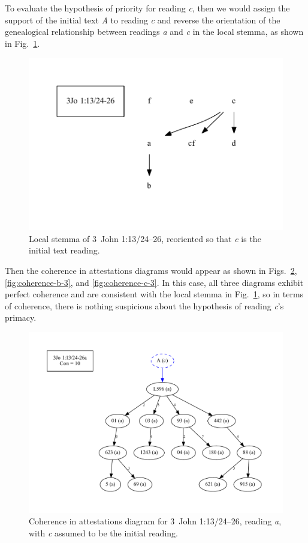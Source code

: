 \documentclass[a4paper, 12pt]{article}
\begin{document}
	To evaluate the hypothesis of priority for reading \emph{c}, then we would assign the support of the initial text \emph{A} to reading \emph{c} and reverse the orientation of the genealogical relationship between readings \emph{a} and \emph{c} in the local stemma, as shown in Fig.~\ref{fig:local-stemma-c-initial}.
	
	\begin{figure}[h!]
		\centering
		\includegraphics[scale=0.6666]{../graphics/B25K1V13U24-26-local-stemma-c-initial.pdf}
		\caption{Local stemma of 3~John 1:13/24–26, reoriented so that \emph{c} is the initial text reading.}
		\label{fig:local-stemma-c-initial}
	\end{figure}
	\noindent
	Then the coherence in attestations diagrams would appear as shown in Figs.~\ref{fig:coherence-a-3}, \ref{fig:coherence-b-3}, and \ref{fig:coherence-c-3}. In this case, all three diagrams exhibit perfect coherence and are consistent with the local stemma in Fig.~\ref{fig:local-stemma-c-initial}, so in terms of coherence, there is nothing suspicious about the hypothesis of reading \emph{c}'s primacy.
	
	\begin{figure}
		\centering
		\includegraphics[scale=0.3333]{../graphics/B25K1V13U24-26Ra-coherence-attestations-3.pdf}
		\caption{Coherence in attestations diagram for 3~John 1:13/24–26, reading \emph{a}, with \emph{c} assumed to be the initial reading.}
		\label{fig:coherence-a-3}
	\end{figure}
	
\end{document}
